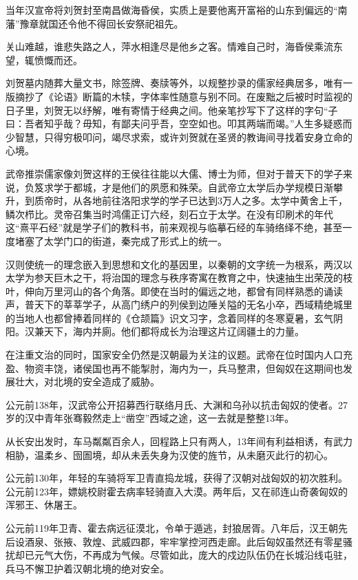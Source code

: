 当年汉宣帝将刘贺封至南昌做海昏侯，实质上是要他离开富裕的山东到偏远的“南藩”豫章就国还令他不得回长安祭祀祖先。

关山难越，谁悲失路之人，萍水相逢尽是他乡之客。情难自己时，海昏侯乘流东望，辄愤慨而还。

刘贺墓内随葬大量文书，除签牌、奏牍等外，以规整抄录的儒家经典居多，唯有一版摘抄了《论语》断篇的木犊，字体率性随意与别不同。在废黜之后被时时监视的日子里，刘贺无以纾解，唯有寄情于经典之间。他亲笔抄写下了这样的字句“子曰：吾者知乎哉？毋知，有鄙夫问乎吾，空空如也。叩其两端而竭。”人生多疑惑而少智慧，只得穷极叩问，竭尽求索，或许刘贺就在圣贤的教诲间寻找着安身立命的心境。

武帝推崇儒家像刘贺这样的王侯往往能以大儒、博士为师，但对于普天下的学子来说，负笈求学于都城，才是他们的夙愿和殊荣。自武帝立太学后办学规模日渐攀升，到质帝时，从各地前往洛阳求学的学子已达到3万人之多。太学中黄舍上千，鳞次栉比。灵帝召集当时鸿儒正订六经，刻石立于太学。在没有印刷术的年代这“熹平石经”就是学子们的教科书，前来观视与临摹石经的车骑络绎不绝，甚至一度堵塞了太学门口的街道，秦完成了形式上的统一。

汉则使统一的理念嵌入到思想和文化的基因里，以秦朝的文字统一为根系，两汉以太学为参天巨木之干，将治国的理念与秩序寄寓在教育之中，快速抽生出荣茂的枝叶，伸向万里河山的各个角落。即使在当时的偏远之地，都曾有同样熟悉的诵读声，普天下的莘莘学子，从高门绣户的列侯到边陲关隘的无名小卒，西域精绝城里的当地人也都曾捧着同样的《仓颉篇》识文习字，念着同样的冬寒夏暑，玄气阴阳。汉兼天下，海内并廁。他们都将成长为治理这片辽阔疆土的力量。

在注重文治的同时，国家安全仍然是汉朝最为关注的议题。武帝在位时国内人口充盈、物资丰饶，诸侯国也再不能掣肘，海内为一，兵马整肃，但匈奴在这期间也发展壮大，对北境的安全造成了威胁。

公元前138年，汉武帝公开招募西行联络月氏、大渊和乌孙以抗击匈奴的使者。27岁的汉中青年张骞毅然走上“凿空”西域之途，这一去就是整整13年。

从长安出发时，车马粼粼百余人，回程路上只有两人，13年间有利益相诱，有武力相胁，温柔乡、囹圄境，却从未丢失身为汉使的旌节，从未磨灭此行的初心。

公元前130年，年轻的车骑将军卫青直捣龙城，获得了汉朝对战匈奴的初次胜利。公元前123年，嫖姚校尉霍去病率轻骑直入大漠。两年后，又在祁连山奇袭匈奴的浑邪王、休屠王。

公元前119年卫青、霍去病远征漠北，令单于遁逃，封狼居胥。八年后，汉王朝先后设酒泉、张掖、敦煌、武威四郡，牢牢掌控河西走廊。此后匈奴虽然还有零星骚扰却已元气大伤，不再成为气候。尽管如此，庞大的戍边队伍仍在长城沿线屯驻，兵马不懈卫护着汉朝北境的绝对安全。

